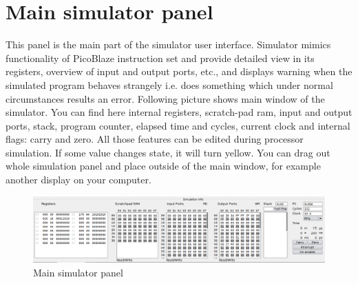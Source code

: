 \section{Main simulator panel}
    This panel is the main part of the simulator user interface. Simulator mimics functionality of PicoBlaze instruction set and provide detailed view in its registers, overview of input and output ports, etc., and displays warning when the simulated program behaves strangely i.e. does something which under normal circumstances results an error. Following picture shows main window of the simulator. You can find here internal registers, scratch-pad ram, input and output ports, stack, program counter, elapsed time and cycles, current clock and internal flags: carry and zero. All those features can be edited during processor simulation. If some value changes state, it will turn yellow. You can drag out whole simulation panel and place outside of the main window, for example another display on your computer.

   \begin{figure}[h!]
        \centering
        \includegraphics[width=\textwidth]{img/bottom_panel.png}
        \caption{Main simulator panel}
    \end{figure}

